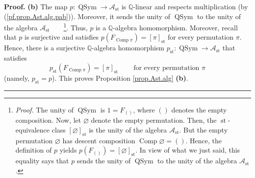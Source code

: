 \documentclass[numbers=enddot,12pt,final,onecolumn,notitlepage]{scrartcl}%
\theoremstyle{definition}
\newenvironment{proof}[1][Proof]{\noindent\textbf{#1.} }{\ \rule{0.5em}{0.5em}}
\begin{document}
\begin{proof}
\textbf{(b)} The map $p:\operatorname*{QSym}\rightarrow\mathcal{A}%
_{\operatorname*{st}}$ is $\mathbb{Q}$-linear and respects multiplication (by
(\ref{pf.prop.Ast.alg.pab})). Moreover, it sends the unity of
$\operatorname*{QSym}$ to the unity of the algebra $\mathcal{A}%
_{\operatorname*{st}}$\ \ \ \ \footnote{\textit{Proof.} The unity of
$\operatorname*{QSym}$ is $1=F_{\left(  {}\right)  }$, where $\left(
{}\right)  $ denotes the empty composition. Now, let $\varnothing$ denote the
empty permutation. Then, the $\operatorname*{st}$-equivalence class $\left[
\varnothing\right]  _{\operatorname*{st}}$ is the unity of the algebra
$\mathcal{A}_{\operatorname*{st}}$. But the empty permutation $\varnothing$
has descent composition $\operatorname*{Comp}\varnothing=\left(  {}\right)  $.
Hence, the definition of $p$ yields $p\left(  F_{\left(  {}\right)  }\right)
=\left[  \varnothing\right]  _{\operatorname*{st}}$. In view of what we just
said, this equality says that $p$ sends the unity of $\operatorname*{QSym}$ to
the unity of the algebra $\mathcal{A}_{\operatorname*{st}}$.}. Thus, $p$ is a
$\mathbb{Q}$-algebra homomorphism. Moreover, recall that $p$ is surjective and
satisfies $p\left(  F_{\operatorname*{Comp}\pi}\right)  =\left[  \pi\right]
_{\operatorname*{st}}$ for every permutation $\pi$. Hence, there is a
surjective $\mathbb{Q}$-algebra homomorphism $p_{\operatorname*{st}%
}:\operatorname*{QSym}\rightarrow\mathcal{A}_{\operatorname*{st}}$ that
satisfies
\[
p_{\operatorname*{st}}\left(  F_{\operatorname*{Comp}\pi}\right)  =\left[
\pi\right]  _{\operatorname*{st}}\ \ \ \ \ \ \ \ \ \ \text{for every
permutation }\pi
\]
(namely, $p_{\operatorname*{st}}=p$). This proves Proposition
\ref{prop.Ast.alg} \textbf{(b)}.
\end{proof}
\end{document}

